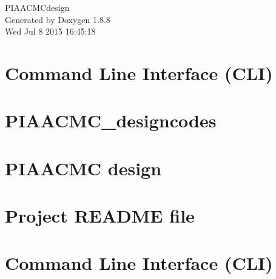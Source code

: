 \documentclass[twoside]{book}
\newcommand{\+}{\discretionary{\mbox{\scriptsize$\hookleftarrow$}}{}{}}
\newcommand{\clearemptydoublepage}{%
  \newpage{\pagestyle{empty}\cleardoublepage}%
}
\begin{document}
\hypersetup{pageanchor=false,
             bookmarks=true,
             bookmarksnumbered=true,
             pdfencoding=unicode
            }
\begin{titlepage}
\vspace*{7cm}
\begin{center}%
{\Large P\+I\+A\+A\+C\+M\+Cdesign }\\
\vspace*{1cm}
{\large Generated by Doxygen 1.8.8}\\
\vspace*{0.5cm}
{\small Wed Jul 8 2015 16:45:18}\\
\end{center}
\end{titlepage}
\clearemptydoublepage
\tableofcontents
\clearemptydoublepage
{}
\hypersetup{pageanchor=true}

\chapter{Command Line Interface (C\+L\+I)}
\label{md_PIAACMCdesign_src_CLIcore}
\hypertarget{md_PIAACMCdesign_src_CLIcore}{}

\chapter{P\+I\+A\+A\+C\+M\+C\+\_\+designcodes}
\label{md_PIAACMCdesign_src_PIAACMCsimul_PIAACMC_designcodes}
\hypertarget{md_PIAACMCdesign_src_PIAACMCsimul_PIAACMC_designcodes}{}

\chapter{P\+I\+A\+A\+C\+M\+C design}
\label{md_PIAACMCdesign_src_PIAACMCsimul_README}
\hypertarget{md_PIAACMCdesign_src_PIAACMCsimul_README}{}

\chapter{Project R\+E\+A\+D\+M\+E file}
\label{md_README}
\hypertarget{md_README}{}

\chapter{Command Line Interface (C\+L\+I)}
\label{md_src_CLIcore}
\hypertarget{md_src_CLIcore}{}

\end{document}
